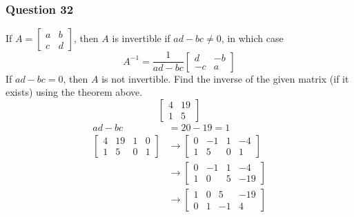 \documentclass{math}
\begin{document}
\subsubsection*{Question 32}
If \( A = \begin{bmatrix}a & b \\ c & d\end{bmatrix} \), then \( A \) is
invertible if \( ad-bc \ne 0 \), in which case
\[ A^{-1} = \frac{1}{ad-bc}\begin{bmatrix}d & -b \\ -c & a\end{bmatrix} \]
If \( ad-bc = 0 \), then \( A \) is not invertible. Find the inverse of the
given matrix (if it exists) using the theorem above.
\[ \begin{bmatrix}
  4 & 19 \\
  1 & 5
\end{bmatrix} \]
\begin{align*}
  ad-bc &= 20-19 = 1 \\
  \begin{bmatrix}
    4 & 19 & 1 & 0 \\
    1 & 5 & 0 & 1
  \end{bmatrix} &\to \begin{bmatrix}
    0 & -1 & 1 & -4 \\
    1 & 5 & 0 & 1
  \end{bmatrix} \\
  &\to \begin{bmatrix}
   0 & -1 & 1 & -4 \\
   1 & 0 & 5 & -19
  \end{bmatrix} \\
  &\to \begin{bmatrix}
    1 & 0 & 5 & -19 \\
    0 & 1 & -1 & 4
  \end{bmatrix}
\end{align*}
\end{document}

